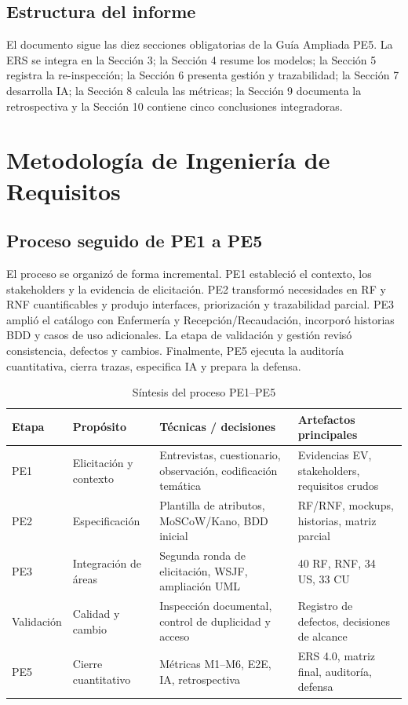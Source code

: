 \documentclass[11pt,a4paper]{article}
\begin{document}
\subsection{Estructura del informe}
El documento sigue las diez secciones obligatorias de la Guía Ampliada PE5. La ERS se integra en la Sección 3; la Sección 4 resume los modelos; la Sección 5 registra la re-inspección; la Sección 6 presenta gestión y trazabilidad; la Sección 7 desarrolla IA; la Sección 8 calcula las métricas; la Sección 9 documenta la retrospectiva y la Sección 10 contiene cinco conclusiones integradoras.
\clearpage
\section{Metodología de Ingeniería de Requisitos}
\subsection{Proceso seguido de PE1 a PE5}
El proceso se organizó de forma incremental. PE1 estableció el contexto, los stakeholders y la evidencia de elicitación. PE2 transformó necesidades en RF y RNF cuantificables y produjo interfaces, priorización y trazabilidad parcial. PE3 amplió el catálogo con Enfermería y Recepción/Recaudación, incorporó historias BDD y casos de uso adicionales. La etapa de validación y gestión revisó consistencia, defectos y cambios. Finalmente, PE5 ejecuta la auditoría cuantitativa, cierra trazas, especifica IA y prepara la defensa.

\begin{table}[H]\centering\caption{Síntesis del proceso PE1--PE5}\label{tab:proceso}
	\begin{tabularx}{\textwidth}{p{1.2cm}p{3cm}Y Y}\toprule
		\textbf{Etapa}&\textbf{Propósito}&\textbf{Técnicas / decisiones}&\textbf{Artefactos principales}\\\midrule
		PE1&Elicitación y contexto&Entrevistas, cuestionario, observación, codificación temática&Evidencias EV, stakeholders, requisitos crudos\\
		PE2&Especificación&Plantilla de atributos, MoSCoW/Kano, BDD inicial&RF/RNF, mockups, historias, matriz parcial\\
		PE3&Integración de áreas&Segunda ronda de elicitación, WSJF, ampliación UML&40 RF, RNF, 34 US, 33 CU\\
		Validación&Calidad y cambio&Inspección documental, control de duplicidad y acceso&Registro de defectos, decisiones de alcance\\
		PE5&Cierre cuantitativo&Métricas M1--M6, E2E, IA, retrospectiva&ERS 4.0, matriz final, auditoría, defensa\\\bottomrule
\end{tabularx}\end{table}
\end{document}
